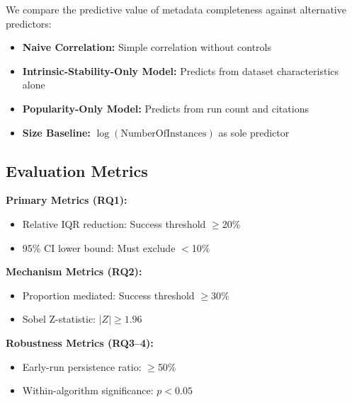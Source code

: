 We compare the predictive value of metadata completeness against alternative predictors:

\begin{itemize}
    \item \textbf{Naive Correlation:} Simple correlation without controls
    \item \textbf{Intrinsic-Stability-Only Model:} Predicts from dataset characteristics alone
    \item \textbf{Popularity-Only Model:} Predicts from run count and citations
    \item \textbf{Size Baseline:} $\log(\text{NumberOfInstances})$ as sole predictor
\end{itemize}

\subsection{Evaluation Metrics}

\textbf{Primary Metrics (RQ1):}
\begin{itemize}
    \item Relative IQR reduction: Success threshold $\geq$20\%
    \item 95\% CI lower bound: Must exclude $<$10\%
\end{itemize}

\textbf{Mechanism Metrics (RQ2):}
\begin{itemize}
    \item Proportion mediated: Success threshold $\geq$30\%
    \item Sobel Z-statistic: $|Z| \geq 1.96$
\end{itemize}

\textbf{Robustness Metrics (RQ3--4):}
\begin{itemize}
    \item Early-run persistence ratio: $\geq$50\%
    \item Within-algorithm significance: $p < 0.05$
\end{itemize}
